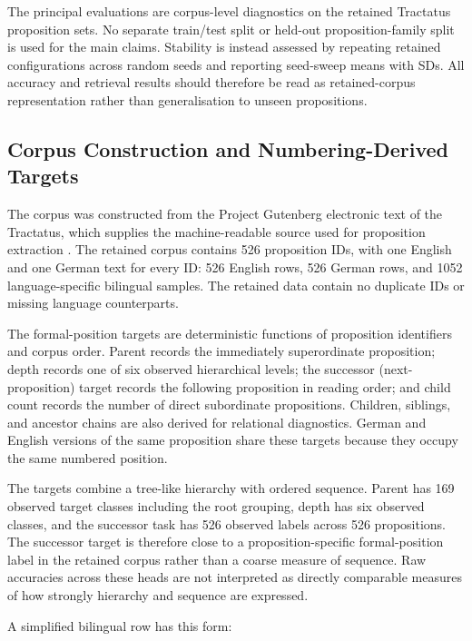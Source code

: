 \documentclass[webpdf,modern,medium,namedate]{oup-authoring-template}
\begin{document}
The principal evaluations are corpus-level diagnostics on the retained Tractatus proposition sets. No separate train/test split or held-out proposition-family split is used for the main claims. Stability is instead assessed by repeating retained configurations across random seeds and reporting seed-sweep means with SDs. All accuracy and retrieval results should therefore be read as retained-corpus representation rather than generalisation to unseen propositions.

\subsection{Corpus Construction and Numbering-Derived Targets}
The corpus was constructed from the Project Gutenberg electronic text of the Tractatus, which supplies the machine-readable source used for proposition extraction \citep{projectgutenbergtractatus}. The retained corpus contains 526 proposition IDs, with one English and one German text for every ID: 526 English rows, 526 German rows, and 1052 language-specific bilingual samples. The retained data contain no duplicate IDs or missing language counterparts.

The formal-position targets are deterministic functions of proposition identifiers and corpus order. Parent records the immediately superordinate proposition; depth records one of six observed hierarchical levels; the successor (next-proposition) target records the following proposition in reading order; and child count records the number of direct subordinate propositions. Children, siblings, and ancestor chains are also derived for relational diagnostics. German and English versions of the same proposition share these targets because they occupy the same numbered position.

The targets combine a tree-like hierarchy with ordered sequence. Parent has 169 observed target classes including the root grouping, depth has six observed classes, and the successor task has 526 observed labels across 526 propositions. The successor target is therefore close to a proposition-specific formal-position label in the retained corpus rather than a coarse measure of sequence. Raw accuracies across these heads are not interpreted as directly comparable measures of how strongly hierarchy and sequence are expressed.

A simplified bilingual row has this form:
\end{document}
